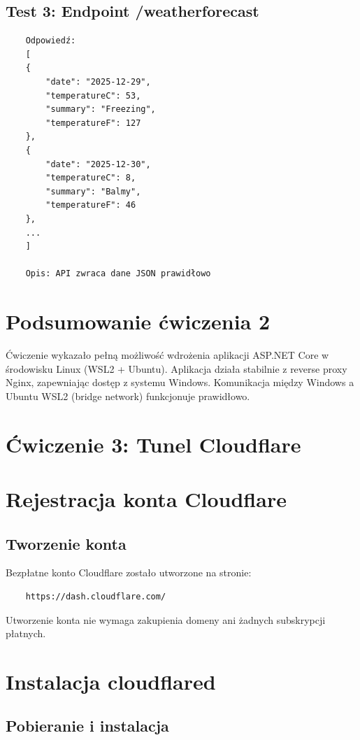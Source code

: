 \documentclass[twoside]{article}
\begin{document}
\subsection{Test 3: Endpoint /weatherforecast}

\begin{verbatim}
	Odpowiedź:
	[
	{
		"date": "2025-12-29",
		"temperatureC": 53,
		"summary": "Freezing",
		"temperatureF": 127
	},
	{
		"date": "2025-12-30",
		"temperatureC": 8,
		"summary": "Balmy",
		"temperatureF": 46
	},
	...
	]
	
	Opis: API zwraca dane JSON prawidłowo
\end{verbatim}


\section{Podsumowanie ćwiczenia 2}

Ćwiczenie wykazało pełną możliwość wdrożenia aplikacji ASP.NET Core w środowisku Linux (WSL2 + Ubuntu). Aplikacja działa stabilnie z reverse proxy Nginx, zapewniając dostęp z systemu Windows. Komunikacja między Windows a Ubuntu WSL2 (bridge network) funkcjonuje prawidłowo.

\section{Ćwiczenie 3: Tunel Cloudflare}

\section{Rejestracja konta Cloudflare}

\subsection{Tworzenie konta}

Bezpłatne konto Cloudflare zostało utworzone na stronie:

\begin{verbatim}
	https://dash.cloudflare.com/
\end{verbatim}

Utworzenie konta nie wymaga zakupienia domeny ani żadnych subskrypcji płatnych.

\section{Instalacja cloudflared}

\subsection{Pobieranie i instalacja}
\end{document}
